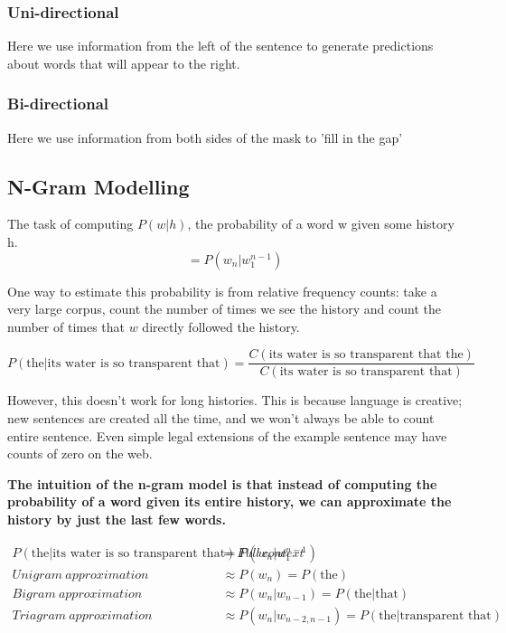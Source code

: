 \documentclass[11pt]{article}
\begin{document}
\subsubsection{Uni-directional}

Here we use information from the left of the sentence to generate predictions about words that will appear to the right.

\subsubsection{Bi-directional}

Here we use information from both sides of the mask to 'fill in the gap'

\subsection{N-Gram Modelling}

The task of computing $P(w|h)$, the probability of a word w given some history h.
\begin{equation*}
    =P(w_n|w_1^{n-1})
\end{equation*}

One way to estimate this probability is from relative frequency counts: take a very large corpus, count the number of times we see the history and count the number of times that $w$ directly followed the history.

\begin{equation*}
    P(\text{the}|\text{its water is so transparent that}) = \frac{C(\text{its water is so transparent that the})}{C(\text{its water is so transparent that})}   
\end{equation*}

However, this doesn't work for long histories. This is because language is creative; new sentences are created all the time, and we won't always be able to count entire sentence. Even simple legal extensions of the example sentence may have counts of zero on the web.

\textbf{The intuition of the n-gram model is that instead of computing the probability of a word given its entire history, we can approximate the history by just the last few words.}

\begin{align*}
    P(\text{the}|\text{its water is so transparent that}) = Full\ context & = P(w_n|w_1^{n-1}) \\
    Unigram\ approximation & \approx P(w_n) = P(\text{the}) \\
    Bigram\ approximation & \approx P(w_n|w_{n-1}) = P(\text{the}|\text{that}) \\
    Triagram\ approximation & \approx P(w_n|w_{n-2,n-1}) = P(\text{the}|\text{transparent\ that})
\end{align*}
\end{document}
